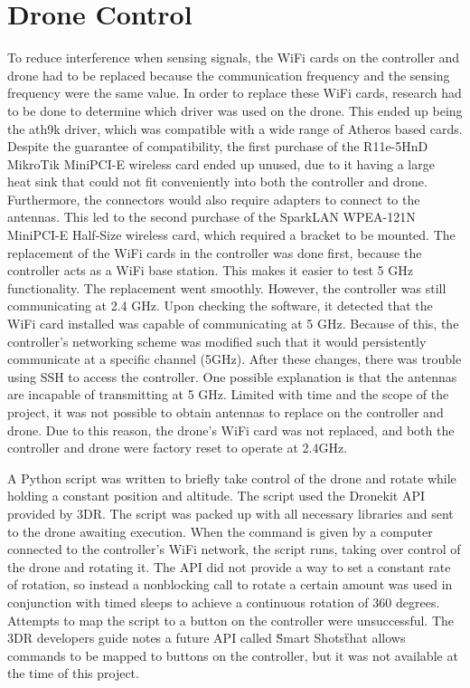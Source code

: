 \section{Drone Control}\label{results:drone_ctl}
To reduce interference when sensing signals, the WiFi cards on the controller and drone had to be replaced because the communication frequency and the sensing frequency were the same value. In order to replace these WiFi cards, research had to be done to determine which driver was used on the drone. This ended up being the ath9k driver, which was compatible with a wide range of Atheros based cards. Despite the guarantee of compatibility, the first purchase of the R11e-5HnD MikroTik MiniPCI-E wireless card ended up unused, due to it having a large heat sink that could not fit conveniently into both the controller and drone. Furthermore, the connectors would also require adapters to connect to the antennas. This led to the second purchase of the SparkLAN WPEA-121N MiniPCI-E Half-Size wireless card, which required a bracket to be mounted. The replacement of the WiFi cards in the controller was done first, because the controller acts as a WiFi base station. This makes it easier to test 5 GHz functionality. The replacement went smoothly. However, the controller was still communicating at 2.4 GHz. Upon checking the software, it detected that the WiFi card installed was capable of communicating at 5 GHz. Because of this, the controller's networking scheme was modified such that it would persistently communicate at a specific channel (5GHz). After these changes, there was trouble using SSH to access the controller. One possible explanation is that the antennas are incapable of transmitting at 5 GHz. Limited with time and the scope of the project, it was not possible to obtain antennas to replace on the controller and drone. Due to this reason, the drone's WiFi card was not replaced, and both the controller and drone were factory reset to operate at 2.4GHz. \par

A Python script was written to briefly take control of the drone and rotate while holding a constant position and altitude. The script used the Dronekit API provided by 3DR. The script was packed up with all necessary libraries and sent to the drone awaiting execution. When the command is given by a computer connected to the controller's WiFi network, the script runs, taking over control of the drone and rotating it. The API did not provide a way to set a constant rate of rotation, so instead a nonblocking call to rotate a certain amount was used in conjunction with timed sleeps to achieve a continuous rotation of 360 degrees. Attempts to map the script to a button on the controller were unsuccessful. The 3DR developers guide notes a future API called \"Smart Shots\" that allows commands to be mapped to buttons on the controller, but it was not available at the time of this project.


